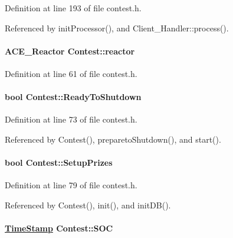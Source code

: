 Definition at line 193 of file contest.h.

Referenced by init\-Processor(), and Client\_\-Handler::process().\hypertarget{classContest_Contesto1}{
\paragraph[reactor]{\setlength{\rightskip}{0pt plus 5cm}ACE\_\-Reactor Contest::reactor}\hfill}
\label{classContest_Contesto1}




Definition at line 61 of file contest.h.\hypertarget{classContest_Contesto5}{
\paragraph[ReadyToShutdown]{\setlength{\rightskip}{0pt plus 5cm}bool Contest::Ready\-To\-Shutdown}\hfill}
\label{classContest_Contesto5}




Definition at line 73 of file contest.h.

Referenced by Contest(), prepareto\-Shutdown(), and start().\hypertarget{classContest_Contesto7}{
\paragraph[SetupPrizes]{\setlength{\rightskip}{0pt plus 5cm}bool Contest::Setup\-Prizes}\hfill}
\label{classContest_Contesto7}




Definition at line 79 of file contest.h.

Referenced by Contest(), init(), and init\-DB().\hypertarget{classContest_Contestm0}{
\paragraph[SOC]{\setlength{\rightskip}{0pt plus 5cm}\hyperlink{classTimeStamp}{Time\-Stamp} Contest::SOC}\hfill}
\label{classContest_Contestm0}




